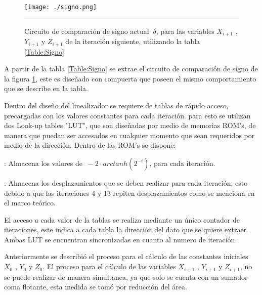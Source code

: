 \begin{figure}[H]
  \centering
    \texttt{[image: ./signo.png]}
    \rule{35em}{0.5pt}
  \caption[Circuito de comparación de signo actual $\ \delta$, para las variables $ X_{i+1} $ , $ Y_{i+1} $ y $ Z_{i+1} $ de la iteración siguiente, utilizando la tabla \ref{Table:Signo}]{Circuito de comparación de signo actual $\ \delta$, para las variables $ X_{i+1} $ , $ Y_{i+1} $ y $ Z_{i+1} $ de la iteración siguiente, utilizando la tabla \ref{Table:Signo}}
  \label{fig:SGN}
\end{figure}


A partir de la tabla \ref{Table:Signo} se extrae el circuito de comparación de signo de la figura \ref{fig:SGN}, este es diseñado con compuerta  que poseen el mismo comportamiento que se describe en la tabla. 

Dentro del diseño del linealizador se requiere de tablas de rápido acceso, precargadas con los valores constantes para cada iteración. para esto se utilizan dos Look-up tables "LUT", que son diseñadas por medio de memorias ROM's, de manera que puedan ser accesados en cualquier momento que sean requeridos por medio de la dirección. 
Dentro de las ROM's se dispone:   

\begin{compactitem}

\item {}: Almacena los valores de $\ -2 \cdot arctanh \left( 2^{-i} \right) $, para cada iteración.  
\item {}: Almacena los desplazamientos que se deben realizar para cada iteración, esto debido a que las iteraciones 4 y 13 repiten desplazamientos como se menciona en el marco teórico. 

\end{compactitem}


El acceso a cada valor de la tablas se realiza mediante un único contador de iteraciones, este indica a cada tabla la dirección del dato que se quiere extraer. Ambas LUT se encuentran sincronizadas en cuanto al numero de iteración. 

Anteriormente se describió el proceso para el cálculo de las constantes iniciales $ X_{0} $ , $ Y_{0} $ y $ Z_{0} $. El proceso para el cálculo de las variables $ X_{i+1} $ , $ Y_{i+1} $ y $ Z_{i+1} $, no se puede realizar de manera simultanea, ya que solo se cuenta con un sumador coma flotante, esta medida se tomó por reducción del área. 

